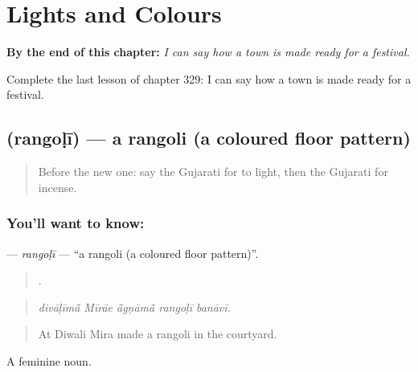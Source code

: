 
\chapter{Lights and Colours}
\label{ch:gu-lights-and-colours}

\begin{chapteropening}
\textbf{By the end of this chapter:} \emph{I can say how a town is made ready for a festival.}

Complete the last lesson of chapter 329: I can say how a town is made ready for a festival.
\end{chapteropening}

\section[\texorpdfstring{\gu{રંગોળી} (rangoḷī)}{રંગોળી (rangoḷī)}]{ (rangoḷī) — a rangoli (a coloured floor pattern)}

\label{lesson:GU-C329-rangoli}



\begin{quote}
Before the new one: say the Gujarati for to light, then the Gujarati for incense.
\end{quote}

\subsection*{You'll want to know: }
\textbf{} — \emph{rangoḷī} — \textquotedblleft{}a rangoli (a coloured floor pattern)\textquotedblright{}.

\begin{quote}
    .
\end{quote}

\begin{quote}
\emph{divāḷīmā̃ Mīrāe ā̃gṇāmā̃ rangoḷī banāvī.}
\end{quote}

\begin{quote}
At Diwali Mira made a rangoli in the courtyard.
\end{quote}

A feminine noun.

